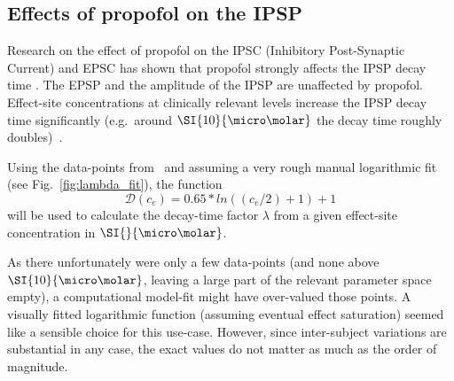 \subsection{Effects of propofol on the IPSP}

Research on the effect of propofol on the IPSC (Inhibitory Post-Synaptic Current) and EPSC
has shown that propofol strongly affects the IPSP decay time \cite{kitamura_effects_2003, mcdougall_propofol_2008}.
The EPSP and the amplitude of the IPSP are unaffected by propofol.
Effect-site concentrations at clinically relevant levels increase the IPSP decay time
significantly (e.g.\ around $\SI{10}{\micro\molar}$ the decay time roughly doubles)~\cite{kitamura_effects_2003}.

Using the data-points from~\cite{kitamura_effects_2003}
and assuming a very rough manual logarithmic fit (see Fig.~\ref{fig:lambda_fit}),
the function
        \[ \mathscr{D}(c_{e}) = 0.65*ln((c_{e}/2)+1)+1 \]
will be used to calculate the decay-time factor $\lambda$ from a given
effect-site concentration in $\SI{}{\micro\molar}$.

As there unfortunately were only a few data-points (and none above $\SI{10}{\micro\molar}$,
leaving a large part of the relevant parameter space empty),
a computational model-fit might have over-valued those points.
A visually fitted logarithmic function (assuming eventual effect saturation) seemed like a sensible choice
for this use-case.
However, since inter-subject variations are substantial in any case,
the exact values do not matter as much as the order of magnitude.


